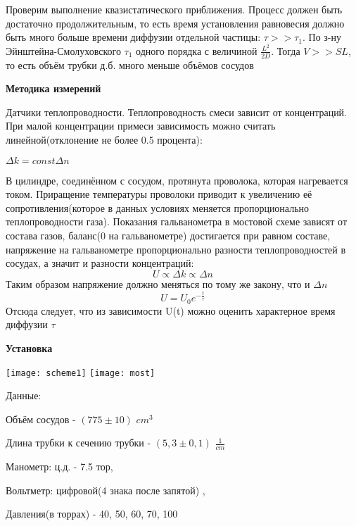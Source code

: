 \documentclass{article}
\begin{document}
 \vspace{30pt}

 Проверим выполнение квазистатического приближения. Процесс должен быть достаточно продолжительным, то есть время установления равновесия должно быть много больше времени диффузии отдельной частицы: $\tau >> \tau_1$. По з-ну $\textit{Эйнштейна-Смолуховского}$ $\tau_1$ одного порядка с величиной $\frac{L^2}{2D}$.  Тогда $ V >> SL $, то есть объём трубки д.б. много меньше объёмов сосудов
 
 \pagebreak

 \textbf{Методика измерений}

 Датчики теплопроводности. Теплопроводность смеси зависит от концентраций. При малой концентрации примеси зависимость можно считать линейной(отклонение не более 0.5 процента):\par $\Delta{k} = const\Delta{n}$
\par
 В цилиндре, соединённом с сосудом, протянута проволока, которая нагревается током. Приращение температуры проволоки
 приводит к увеличению её сопротивления(которое в данных условиях меняется пропорционально теплопроводности газа). 
 Показания гальванометра в мостовой схеме зависят от состава газов, баланс(0 на гальванометре) достигается при равном составе, напряжение на гальванометре пропорционально разности теплопроводностей в сосудах, а значит и разности концентраций:
 \[U\propto \Delta{k} \propto \Delta{n}\]
 Таким образом напряжение должно меняться по тому же закону, что и $\Delta{n}$
 \[U = U_0e^{-\frac{t}{\tau}}\]
 Отсюда следует, что из зависимости U(t) можно оценить характерное время диффузии $\tau$

\vspace{10pt}

\textbf{Установка}

\texttt{[image: scheme1]} 
\texttt{[image: most]} 

\pagebreak

Данные:

Объём сосудов - $(775\pm10)$ $cm^3$ \par 
Длина трубки к сечению трубки - $(5,3\pm0,1)$ $\frac{1}{cm}$\par
\vspace{6pt}

Манометр: ц.д. - 7.5 тор, \par
Вольтметр: цифровой(4 знака после запятой) , \par
Давления(в торрах) - 40, 50, 60, 70, 100 \par
\end{document}
